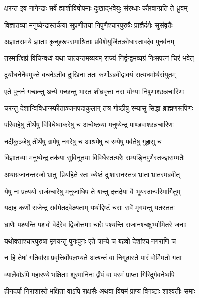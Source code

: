 \twolineshloka
{क्षरन्त इव नागेन्द्राः सर्वे ह्याशीविषोपमाः}
{दुःखाद्भवेयुः संरब्धाः कौरवान्प्रति ते ध्रुवम्}


\twolineshloka
{विज्ञातव्या मनुष्येन्द्रास्तर्कया सुप्रणीतया}
{निपुणैश्चारपुरुषैः प्राज्ञैर्दक्षैः सुसंवृतैः}


\twolineshloka
{अज्ञातसमये ज्ञाताः कृच्छ्ररूपसमाश्रिताः}
{प्रविशेयुर्जितक्रोधास्तावदेव पुनर्वनम्}


\twolineshloka
{तस्मात्क्षिप्रं विचिन्वध्वं यथा चात्यन्तमव्ययम्}
{राज्यं निर्द्वन्द्वमव्यग्रं निःसपत्नं चिरं भवेत्}


\twolineshloka
{दुर्योधनेनैवमुक्ते वचनेऽतीव दुःखिना}
{ततः कर्णोऽब्रवीद्वाक्यं सत्यधर्मार्थसंयुतम्}


\twolineshloka
{एते पुनर्न गच्छन्तु अन्ये गच्छन्तु भारत}
{शीघ्रवृत्ता नरा योग्या निपुणाश्छन्नचारिणः}


\twolineshloka
{चरन्तु देशान्विविधान्स्फीताञ्जनपदाकुलान्}
{तत्र गोष्ठीषु रम्यासु सिद्धा ब्राह्मणरूपिणः}


\twolineshloka
{परिवाहेषु तीर्थेषु विविधेष्वाकरेषु च}
{अन्वेष्टव्या मनुष्येन्द्र पाण्डवाश्छन्नचारिणः}


\twolineshloka
{नदीकुञ्जेषु तीर्थेषु ग्रामेषु नगरेषु च}
{आश्रमेषु च रम्येषु पर्वतेषु गुहासु च}


\twolineshloka
{विज्ञातव्या मनुष्येन्द्र तर्कया सुविनूतया}
{विविधैस्तत्परैः सम्यङ्निपुणैस्तज्ज्ञसम्मतैः}


\twolineshloka
{अथाग्रजानन्तरजो भ्रातुः प्रियहिते रतः}
{ज्येष्ठं दुःशासनस्तत्र भ्राता भ्रातरमब्रवीत्}


\twolineshloka
{येषु नः प्रत्ययो राजंश्चारेषु मनुजाधिप}
{ते यान्तु दत्तदेया वै भूयस्तान्परिमार्गितुम्}


\twolineshloka
{यदाह कर्णो राजेन्द्र सर्वमेतदवेक्ष्यताम्}
{यथोद्दिष्टं चराः सर्वे मृगयन्तु यतस्ततः}


\twolineshloka
{घ्राणैः पश्यन्ति पशवो वेदैरेव द्विजोत्तमाः}
{चारैः पश्यन्ति राजानश्चक्षुर्भ्यामितरे जनाः}


\twolineshloka
{यथोक्ताश्चारपुरुषा मृगयन्तु पुनःपुनः}
{एते चान्ये च बहवो देशांश्च नगराणि च}


\twolineshloka
{न हि तेषां गतिर्वासः प्रवृत्तिर्वोपलभ्यते}
{अत्यन्तं वा निगूढास्ते पारं वोर्मिमतो गताः}


\twolineshloka
{व्यालैर्वाऽपि महारण्ये भक्षिताः शूरमानिनः}
{द्वीपं वा परमं प्राप्ता गिरिदुर्गवनेष्वपि}


\twolineshloka
{हीनदर्पा निराशास्ते भक्षिता वाऽपि राक्षसैः}
{अथवा विषमं प्राप्य विनष्टाः शाश्वतीः समाः}


